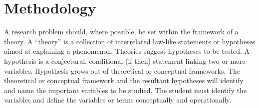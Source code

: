 \section{Methodology} \label{methods}

A research problem should, where possible, be set within the framework of a
theory. A ``theory'' is a collection of interrelated law-like statements or
hypotheses aimed at explaining a phenomenon. Theories suggest hypotheses to be
tested. A hypothesis is a conjectural, conditional (if-then) statement linking
two or more variables. Hypothesis grows out of theoretical or conceptual
frameworks. The theoretical or conceptual framework and the resultant
hypotheses will identify and name the important variables to be studied. The
student must identify the variables and define the variables or terms
conceptually and operationally.
